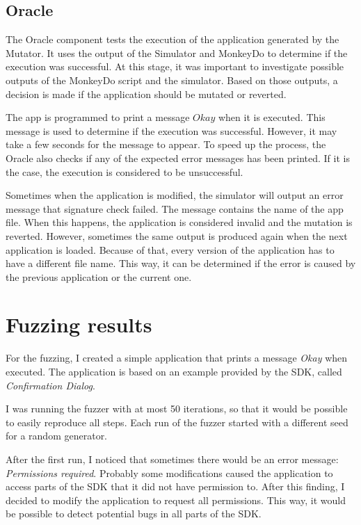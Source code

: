 \subsection*{Oracle}
The Oracle component tests the execution of the application generated by the Mutator.
It uses the output of the Simulator and MonkeyDo to determine if the execution was successful.
At this stage, it was important to investigate possible outputs of the MonkeyDo script and the simulator.
Based on those outputs, a decision is made if the application should be mutated or reverted.

The app is programmed to print a message $Okay$ when it is executed.
This message is used to determine if the execution was successful.
However, it may take a few seconds for the message to appear.
To speed up the process, the Oracle also checks if any of the expected error messages has been printed.
If it is the case, the execution is considered to be unsuccessful.

Sometimes when the application is modified, the simulator will output an error message that signature check failed.
The message contains the name of the app file.
When this happens, the application is considered invalid and the mutation is reverted.
However, sometimes the same output is produced again when the next application is loaded.
Because of that, every version of the application has to have a different file name.
This way, it can be determined if the error is caused by the previous application or the current one.


\section{Fuzzing results}

For the fuzzing, I created a simple application that prints a message \textit{Okay} when executed.
The application is based on an example provided by the SDK, called \textit{Confirmation Dialog}.

I was running the fuzzer with at most 50 iterations, so that it would be possible to easily reproduce all steps.
Each run of the fuzzer started with a different seed for a random generator.

After the first run, I noticed that sometimes there would be an error message: \textit{Permissions required}.
Probably some modifications caused the application to access parts of the SDK that it did not have permission to.
After this finding, I decided to modify the application to request all permissions.
This way, it would be possible to detect potential bugs in all parts of the SDK\@.

